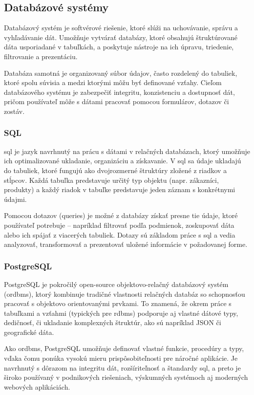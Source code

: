  \subsection{Databázové systémy}
 Databázový systém je softvérové riešenie, ktoré slúži na uchovávanie, správu a vyhľadávanie dát. 
 Umožňuje vytvárať databázy, ktoré obsahujú štruktúrované dáta usporiadané v tabuľkách, a poskytuje nástroje na ich úpravu, triedenie, filtrovanie a prezentáciu.
 
 Databáza samotná je organizovaný súbor údajov, často rozdelený do tabuliek, ktoré spolu súvisia a medzi ktorými môžu byť definované vzťahy. 
 Cieľom databázového systému je zabezpečiť integritu, konzistenciu a dostupnosť dát, pričom používateľ môže s dátami pracovať pomocou formulárov, dotazov či zostáv.\cite{databazovesystemy}
 
 \subsubsection{SQL}
 \acrfull{sql} je jazyk navrhnutý na prácu s dátami v relačných databázach, ktorý umožňuje ich optimalizované ukladanie, organizáciu a získavanie.
 V \acrshort{sql} sa údaje ukladajú do tabuliek, ktoré fungujú ako dvojrozmerné štruktúry zložené z riadkov a stĺpcov. 
 Každá tabuľka predstavuje určitý typ objektu (napr. zákazníci, produkty) a každý riadok v tabuľke predstavuje jeden záznam s konkrétnymi údajmi.
 
 Pomocou dotazov (queries) je možné z databázy získať presne tie údaje, ktoré používateľ potrebuje – napríklad filtrovať podľa podmienok, zoskupovať dáta alebo ich spájať z viacerých tabuliek.
 Dotazy sú základom práce s \acrshort{sql} a vedia analyzovať, transformovať a prezentovať uložené informácie v požadovanej forme.\cite{sql}\cite{aipreklad}
 
 \subsubsection{PostgreSQL}
 PostgreSQL je pokročilý open-source objektovo-relačný databázový systém (\acrshort{ordbms}), ktorý kombinuje tradičné vlastnosti relačných databáz so schopnosťou pracovať s objektovo orientovanými prvkami. 
 To znamená, že okrem práce s tabuľkami a vzťahmi (typických pre \acrfull{rdbms}) podporuje aj vlastné dátové typy, dedičnosť, či ukladanie komplexných štruktúr, ako sú napríklad JSON či geografické dáta.
 
 Ako \acrshort{ordbms}, PostgreSQL umožňuje definovať vlastné funkcie, procedúry a typy, vďaka čomu ponúka vysokú mieru prispôsobiteľnosti pre náročné aplikácie. 
 Je navrhnutý s dôrazom na integritu dát, rozšíriteľnosť a štandardy \acrshort{sql}, a preto je široko používaný v podnikových riešeniach, výskumných systémoch aj moderných webových aplikáciách.\cite{postgre}\cite{aipreklad}
